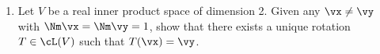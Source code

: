 \begin{exercises}
\begin{enumerate}[label=\thesubsection.\arabic*., align=right]
%  
%   
	
	\item Let $V$ be a real inner product space of dimension 2. Given any $\vx\neq \vy$ with $\Nm\vx=\Nm\vy=1$, show that there exists a unique rotation $T\in\cL(V)$ such that $T(\vx)=\vy$.
\end{enumerate}
\end{exercises}